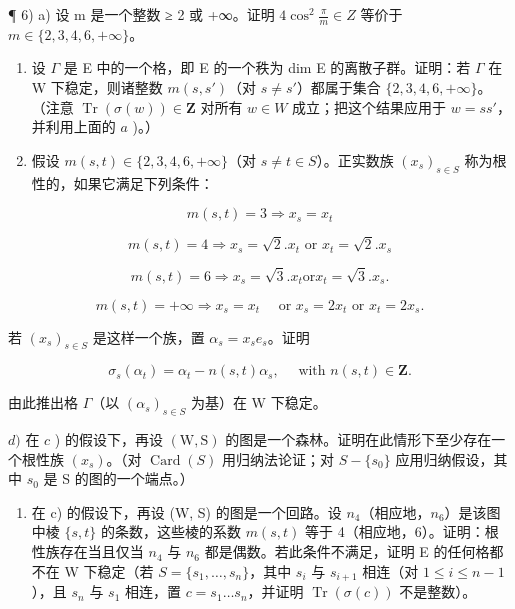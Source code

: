¶ 6) a) 设 m 是一个整数 ≥ 2 或 +∞。证明 \(4 \cos^{2} \frac{\pi}{m} \in Z\) 等价于 \(m \in \{2, 3, 4, 6, +\infty\}\)。

\begin{enumerate}
\def\labelenumi{\alph{enumi})}
\setcounter{enumi}{1}
\item
  设 \(\Gamma\) 是 E 中的一个格，即 E 的一个秩为 dim E 的离散子群。证明：若 \(\Gamma\) 在 W 下稳定，则诸整数 \(m(s, s')\)（对 \(s \neq s'\)）都属于集合 \(\{2, 3, 4, 6, +\infty\}\)。（注意 \(\operatorname{Tr}(\sigma(w)) \in \mathbf{Z}\) 对所有 \(w \in W\) 成立；把这个结果应用于 \(w = ss'\)，并利用上面的 \(a\) )。）
\item
  假设 \(m(s, t) \in \{2, 3, 4, 6, +\infty\}\)（对 \(s \neq t \in S\)）。正实数族 \((x_s)_{s \in S}\) 称为根性的，如果它满足下列条件：
\end{enumerate}

\[
m (s, t) = 3 \Longrightarrow x _ {s} = x _ {t}
\]

\[
m (s, t) = 4 \Longrightarrow x _ {s} = \sqrt {2}. x _ {t} \text { or } x _ {t} = \sqrt {2}. x _ {s}
\]

\[
m (s, t) = 6 \Longrightarrow x _ {s} = \sqrt {3}. x _ {t} \text {or} x _ {t} = \sqrt {3}. x _ {s}.
\]

\[
m (s, t) = + \infty \Longrightarrow x _ {s} = x _ {t} \quad \text { or } x _ {s} = 2 x _ {t} \text { or } x _ {t} = 2 x _ {s}.
\]

若 \((x_{s})_{s\in S}\) 是这样一个族，置 \(\alpha_{s} = x_{s}e_{s}\)。证明

\[
\sigma_ {s} (\alpha_ {t}) = \alpha_ {t} - n (s, t) \alpha_ {s}, \quad \text { with } n (s, t) \in \mathbf {Z}.
\]

由此推出格 \(\Gamma\)（以 \((\alpha_s)_{s\in S}\) 为基）在 W 下稳定。

  \(d)\) 在 \(c\) ) 的假设下，再设 \((\mathrm{W},\mathrm{S})\) 的图是一个森林。证明在此情形下至少存在一个根性族 \((x_{s})\)。（对 \(\operatorname{Card}(S)\) 用归纳法论证；对 \(S - \{s_{0}\}\) 应用归纳假设，其中 \(s_{0}\) 是 S 的图的一个端点。）

\begin{enumerate}
\def\labelenumi{\alph{enumi})}
\setcounter{enumi}{4}
\tightlist
\item
  在 c) 的假设下，再设 (W, S) 的图是一个回路。设 \(n_{4}\)（相应地，\(n_{6}\)）是该图中棱 \(\{s, t\}\) 的条数，这些棱的系数 \(m(s, t)\) 等于 4（相应地，6）。证明：根性族存在当且仅当 \(n_{4}\) 与 \(n_{6}\) 都是偶数。若此条件不满足，证明 E 的任何格都不在 W 下稳定（若 \(S = \{s_{1}, \ldots, s_{n}\}\)，其中 \(s_{i}\) 与 \(s_{i+1}\) 相连（对 \(1 \leqslant i \leqslant n - 1\)），且 \(s_{n}\) 与 \(s_{1}\) 相连，置 \(c = s_{1} \ldots s_{n}\)，并证明 \(\operatorname{Tr}(\sigma(c))\) 不是整数）。
\end{enumerate}

